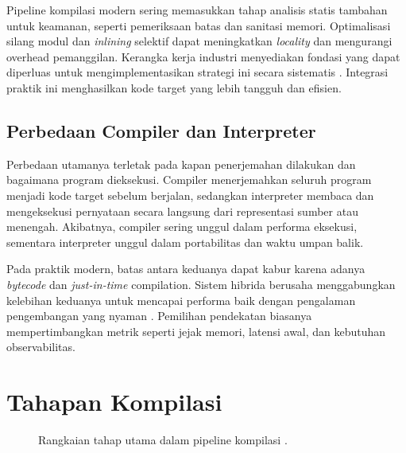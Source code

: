 \documentclass[../main.tex]{subfiles}
\begin{document}
Pipeline kompilasi modern sering memasukkan tahap analisis statis tambahan untuk keamanan, seperti pemeriksaan batas dan sanitasi memori. Optimalisasi silang modul dan \emph{inlining} selektif dapat meningkatkan \emph{locality} dan mengurangi overhead pemanggilan. Kerangka kerja industri menyediakan fondasi yang dapat diperluas untuk mengimplementasikan strategi ini secara sistematis \citep{LLVMOverview,GCCInternals}. Integrasi praktik ini menghasilkan kode target yang lebih tangguh dan efisien.

\subsection{Perbedaan Compiler dan Interpreter}
Perbedaan utamanya terletak pada kapan penerjemahan dilakukan dan bagaimana program dieksekusi. Compiler menerjemahkan seluruh program menjadi kode target sebelum berjalan, sedangkan interpreter membaca dan mengeksekusi pernyataan secara langsung dari representasi sumber atau menengah. Akibatnya, compiler sering unggul dalam performa eksekusi, sementara interpreter unggul dalam portabilitas dan waktu umpan balik.

Pada praktik modern, batas antara keduanya dapat kabur karena adanya \emph{bytecode} dan \emph{just-in-time} compilation. Sistem hibrida berusaha menggabungkan kelebihan keduanya untuk mencapai performa baik dengan pengalaman pengembangan yang nyaman \citep{CS143}. Pemilihan pendekatan biasanya mempertimbangkan metrik seperti jejak memori, latensi awal, dan kebutuhan observabilitas.

\section{Tahapan Kompilasi}
\begin{figure}[t]
  \centering
  \caption{Rangkaian tahap utama dalam pipeline kompilasi \citep{Mogensen2010,LLVMOverview}.}
  \label{fig:pipeline}
\end{figure}
\end{document}
